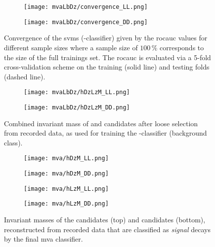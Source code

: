 \begin{figure}[htbp]
    \centering
    \begin{subfigure}[b]{.49\textwidth}
        \centering
        \texttt{[image: mvaLbDz/convergence\_LL.png]}
    \end{subfigure}
    \begin{subfigure}[b]{.49\textwidth}
        \centering
        \texttt{[image: mvaLbDz/convergence\_DD.png]}
    \end{subfigure}
    \caption{Convergence of the \glspl{svm} (\Lb-\Dz classifier) given by the \gls{rocauc} values for different sample sizes where a sample size of $100\,\%$ corresponds to the size of the full trainings set. The \gls{rocauc} is evaluated via a 5-fold cross-validation scheme on the training (solid line) and testing folds (dashed line).}
    \label{fig:mvaLbDz_convergence}
\end{figure}

\begin{figure}[htbp]
    \centering
    \begin{subfigure}[b]{.49\textwidth}
        \centering
        \texttt{[image: mvaLbDz/hDzLzM\_LL.png]}
    \end{subfigure}
    \begin{subfigure}[b]{.49\textwidth}
        \centering
        \texttt{[image: mvaLbDz/hDzLzM\_DD.png]}
    \end{subfigure}
    \caption{Combined invariant mass of \Dz and \Lz candidates after loose selection from recorded data, as used for training the \Lb-\Dz classifier (background class).}
    \label{fig:mvaLbDz_hDzLzM}
\end{figure}

\begin{figure}[htbp]
    \centering
    \begin{subfigure}{.49\textwidth}
        \centering
        \texttt{[image: mva/hDzM\_LL.png]}
    \end{subfigure}
    \begin{subfigure}{.49\textwidth}
        \centering
        \texttt{[image: mva/hDzM\_DD.png]}
    \end{subfigure}
    \par\bigskip 
    \begin{subfigure}{.49\textwidth}
        \centering
        \texttt{[image: mva/hLzM\_LL.png]}
    \end{subfigure}
    \begin{subfigure}{.49\textwidth}
        \centering
        \texttt{[image: mva/hLzM\_DD.png]}
    \end{subfigure}
    \caption{Invariant masses of the \Dz candidates (top) and \Lz candidates (bottom), reconstructed from recorded data that are classified as \textit{signal} \decay{\Lb}{\Dz\Lz} decays by the final \gls{mva} classifier.}
    \label{fig:mva_hm}
\end{figure}

